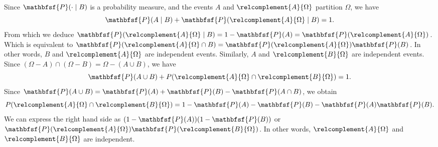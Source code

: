 Since $\mathbfsf{P} (\cdot \mid B)$ is a probability measure, and the events $A$ and $\relcomplement{A}{\Omega }$ partition $\Omega $, we have
  \[
\mathbfsf{P} (A \mid B) + \mathbfsf{P} (\relcomplement{A}{\Omega } \mid B) = 1.
  \]
From which we deduce $\mathbfsf{P} (\relcomplement{A}{\Omega } \mid B) = 1 - \mathbfsf{P} (A) = \mathbfsf{P} (\relcomplement{A}{\Omega })$.
Which is equivalent to $\mathbfsf{P} (\relcomplement{A}{\Omega } \cap B) = \mathbfsf{P} (\relcomplement{A}{\Omega })\mathbfsf{P} (B)$.
In other words, $B$ and $\relcomplement{A}{\Omega }$ are independent events.
Similarly, $A$ and $\relcomplement{B}{\Omega }$ are independent events.
Since $(\Omega  - A) \cap (\Omega  - B) = \Omega  - (A \cup B)$, we have
  \[
\mathbfsf{P} (A \cup B) + P(\relcomplement{A}{\Omega } \cap \relcomplement{B}{\Omega }) = 1.
  \]
Since $\mathbfsf{P} (A \cup B) = \mathbfsf{P} (A) + \mathbfsf{P} (B) - \mathbfsf{P} (A \cap B)$, we obtain
  \[
P(\relcomplement{A}{\Omega } \cap \relcomplement{B}{\Omega }) = 1 - \mathbfsf{P} (A) - \mathbfsf{P} (B) - \mathbfsf{P} (A)\mathbfsf{P} (B).
  \]
We can express the right hand side as $(1 - \mathbfsf{P} (A))(1 - \mathbfsf{P} (B))$ or $\mathbfsf{P} (\relcomplement{A}{\Omega })\mathbfsf{P} (\relcomplement{B}{\Omega })$.
In other words, $\relcomplement{A}{\Omega }$ and $\relcomplement{B}{\Omega }$ are independent.
